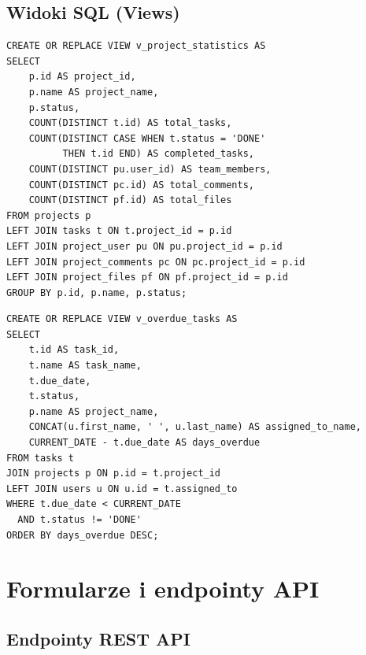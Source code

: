 \documentclass[12pt,a4paper]{report}
\begin{document}
\subsection{Widoki SQL (Views)}

\begin{lstlisting}[style=sqlstyle, caption={Widok statystyk projektów}]
CREATE OR REPLACE VIEW v_project_statistics AS
SELECT 
    p.id AS project_id,
    p.name AS project_name,
    p.status,
    COUNT(DISTINCT t.id) AS total_tasks,
    COUNT(DISTINCT CASE WHEN t.status = 'DONE' 
          THEN t.id END) AS completed_tasks,
    COUNT(DISTINCT pu.user_id) AS team_members,
    COUNT(DISTINCT pc.id) AS total_comments,
    COUNT(DISTINCT pf.id) AS total_files
FROM projects p
LEFT JOIN tasks t ON t.project_id = p.id
LEFT JOIN project_user pu ON pu.project_id = p.id
LEFT JOIN project_comments pc ON pc.project_id = p.id
LEFT JOIN project_files pf ON pf.project_id = p.id
GROUP BY p.id, p.name, p.status;
\end{lstlisting}

\begin{lstlisting}[style=sqlstyle, caption={Widok zadań po terminie}]
CREATE OR REPLACE VIEW v_overdue_tasks AS
SELECT 
    t.id AS task_id,
    t.name AS task_name,
    t.due_date,
    t.status,
    p.name AS project_name,
    CONCAT(u.first_name, ' ', u.last_name) AS assigned_to_name,
    CURRENT_DATE - t.due_date AS days_overdue
FROM tasks t
JOIN projects p ON p.id = t.project_id
LEFT JOIN users u ON u.id = t.assigned_to
WHERE t.due_date < CURRENT_DATE 
  AND t.status != 'DONE'
ORDER BY days_overdue DESC;
\end{lstlisting}

\section{Formularze i endpointy API}

\subsection{Endpointy REST API}
\end{document}
